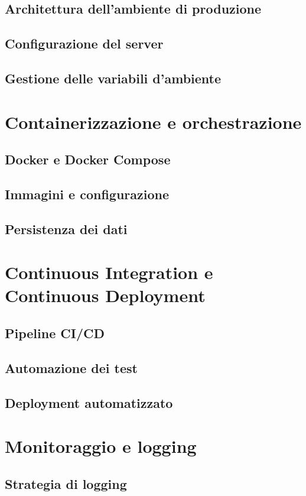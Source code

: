 \documentclass[12pt,a4paper,oneside]{report}
\begin{document}
\subsection{Architettura dell'ambiente di produzione}
\subsection{Configurazione del server}
\subsection{Gestione delle variabili d'ambiente}

\section{Containerizzazione e orchestrazione}
\subsection{Docker e Docker Compose}
\subsection{Immagini e configurazione}
\subsection{Persistenza dei dati}

\section{Continuous Integration e Continuous Deployment}
\subsection{Pipeline CI/CD}
\subsection{Automazione dei test}
\subsection{Deployment automatizzato}

\section{Monitoraggio e logging}
\subsection{Strategia di logging}
\end{document}
